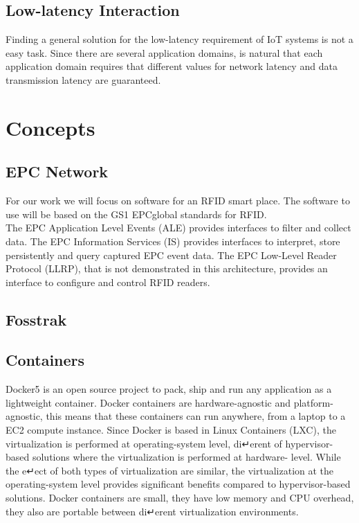 \subsection{Low-latency Interaction}
\label{sub:low_latency_interaction}
Finding a general solution for the low-latency requirement of \gls{IoT} systems is not a easy task.
Since there are several application domains, is natural that each application domain requires
that different values for network latency and data transmission latency are guaranteed.

 \section{Concepts}
 \label{sec:Concepts}

\subsection{EPC Network}
\label{sub:epc_network}
For our work we will focus on software for an RFID smart place. The software to use will be based on
the GS1 EPCglobal standards for RFID.\\

The EPC Application Level Events (ALE) provides interfaces to filter and collect data. The EPC
Information Services (IS) provides interfaces to interpret, store persistently and query captured
EPC event data. The EPC Low-Level Reader Protocol (LLRP), that is not demonstrated in this
architecture, provides an interface to configure and control RFID readers.

\subsection{Fosstrak}
\label{sub:fosstrak}

\subsection{Containers}
\label{sub:containers}
Docker5 is an open source project to pack, ship and run any application as a lightweight container.
Docker containers are hardware-agnostic and platform-agnostic, this means that these containers can
run anywhere, from a laptop to a EC2 compute instance. Since Docker is based in Linux Containers (LXC),
the virtualization is performed at operating-system level, di↵erent of hypervisor-based solutions where
the virtualization is performed at hardware- level. While the e↵ect of both types of virtualization
are similar, the virtualization at the operating-system level provides significant benefits compared
to hypervisor-based solutions. Docker containers are small, they have low memory and CPU overhead,
they also are portable between di↵erent virtualization environments.\\

